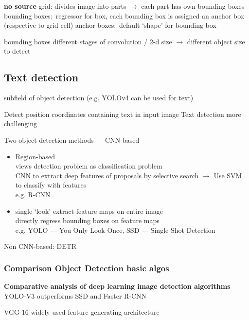 \textbf{no source}
grid: divides image into parts $\rightarrow$ each part has own bounding boxes
bounding boxes:~regressor for box, each bounding box is assigned an anchor box (respective to grid cell)
anchor boxes:~default `shape' for bounding box

bounding boxes different stages of convolution / 2-d size $\rightarrow$ different object size to detect

\subsection*{Text detection}
subfield of object detection (e.g. YOLOv4 can be used for text)

Detect position coordinates containing text in input image
Text detection more challenging

Two object detection methods --- CNN-based
\begin{itemize}
    \item Region-based \\
        views detection problem as classification problem\\
        CNN to extract deep features of proposals by selective search $\rightarrow$  Use SVM to
            classify with features\\
        e.g. R-CNN
    \item  single `look'
        extract feature maps on entire image\\
        directly regress bounding boxes on feature maps\\
        e.g. YOLO --- You Only Look Once, SSD --- Single Shot Detection
\end{itemize}
Non CNN-based: DETR

\subsubsection*{Comparison Object Detection basic algos}
\textbf{Comparative analysis of deep learning image detection
algorithms}~\citep{srivastava_comparative_2021}
YOLO-V3 outperforms SSD and Faster R-CNN

VGG-16 widely used feature generating architecture

